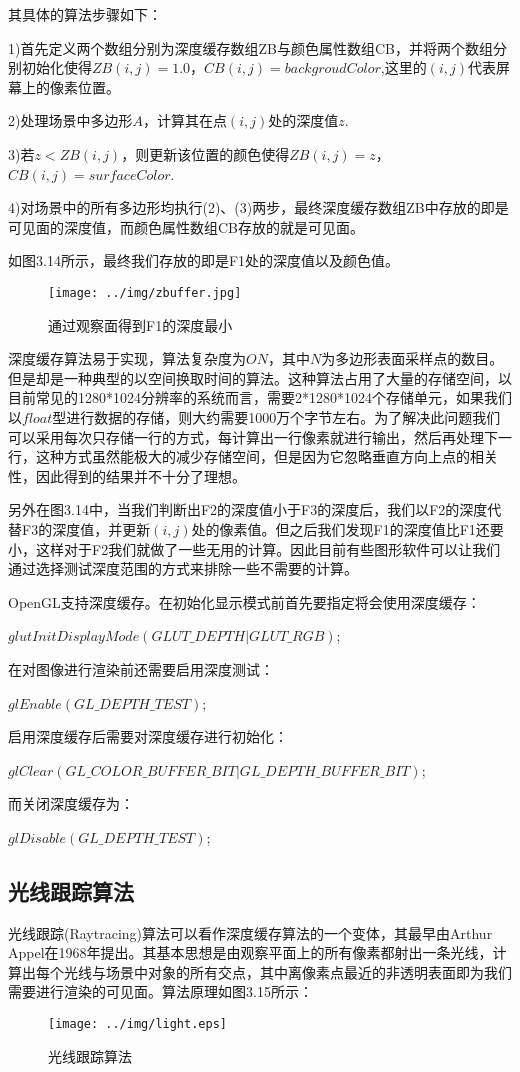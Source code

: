 其具体的算法步骤如下：

1)首先定义两个数组分别为深度缓存数组ZB与颜色属性数组CB，并将两个数组分别初始化使得$ZB(i,j)=1.0$，$CB(i,j)=backgroudColor$,这里的$(i,j)$代表屏幕上的像素位置。

2)处理场景中多边形$A$，计算其在点$(i,j)$处的深度值$z$.

3)若$z<ZB(i,j)$，则更新该位置的颜色使得$ZB(i,j)=z$，$CB(i,j)=surfaceColor$.

4)对场景中的所有多边形均执行(2)、(3)两步，最终深度缓存数组ZB中存放的即是可见面的深度值，而颜色属性数组CB存放的就是可见面。

如图3.14所示，最终我们存放的即是F1处的深度值以及颜色值\cite{Donald10}。

\begin{figure}[htb]
\centering
\texttt{[image: ../img/zbuffer.jpg]}
\caption{通过观察面得到F1的深度最小}
\label{fig：graph}
\end{figure} 

深度缓存算法易于实现，算法复杂度为$O{N}$，其中$N$为多边形表面采样点的数目。但是却是一种典型的以空间换取时间的算法。这种算法占用了大量的存储空间，以目前常见的1280*1024分辨率的系统而言，需要2*1280*1024个存储单元，如果我们以$float$型进行数据的存储，则大约需要1000万个字节左右。为了解决此问题我们可以采用每次只存储一行的方式，每计算出一行像素就进行输出，然后再处理下一行\cite{PanYH03}，这种方式虽然能极大的减少存储空间，但是因为它忽略垂直方向上点的相关性，因此得到的结果并不十分了理想。

另外在图3.14中，当我们判断出F2的深度值小于F3的深度后，我们以F2的深度代替F3的深度值，并更新$(i,j)$处的像素值。但之后我们发现F1的深度值比F1还要小，这样对于F2我们就做了一些无用的计算。因此目前有些图形软件可以让我们通过选择测试深度范围的方式来排除一些不需要的计算。

OpenGL支持深度缓存。在初始化显示模式前首先要指定将会使用深度缓存：

$glutInitDisplayMode(GLUT\_DEPTH | GLUT\_RGB)$;

在对图像进行渲染前还需要启用深度测试：

$glEnable(GL\_DEPTH\_TEST)$;

启用深度缓存后需要对深度缓存进行初始化：

$glClear(GL\_COLOR\_BUFFER\_BIT | GL\_DEPTH\_BUFFER\_BIT)$;

而关闭深度缓存为：

$glDisable(GL\_DEPTH\_TEST)$;

\subsection{光线跟踪算法}
光线跟踪(Raytracing)算法可以看作深度缓存算法的一个变体，其最早由Arthur
Appel在1968年提出。其基本思想是由观察平面上的所有像素都射出一条光线，计算出每个光线与场景中对象的所有交点，其中离像素点最近的非透明表面即为我们需要进行渲染的可见面。算法原理如图3.15所示：
\begin{figure}[htb]
\centering
\texttt{[image: ../img/light.eps]}
\caption{光线跟踪算法}
\label{fig：graph}
\end{figure} 

